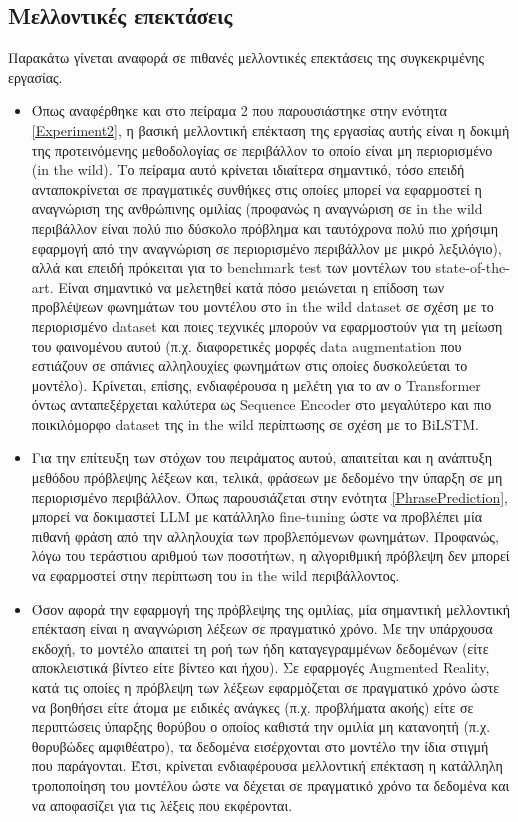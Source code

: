 \subsection{Μελλοντικές επεκτάσεις}
\label{Future}

Παρακάτω γίνεται αναφορά σε πιθανές μελλοντικές επεκτάσεις της συγκεκριμένης εργασίας.

\begin{itemize}

\item Όπως αναφέρθηκε και στο πείραμα 2 που παρουσιάστηκε στην ενότητα \ref{Experiment2}, η βασική μελλοντική επέκταση της εργασίας αυτής είναι η δοκιμή της προτεινόμενης μεθοδολογίας σε περιβάλλον το οποίο είναι μη περιορισμένο (in the wild). Το πείραμα αυτό κρίνεται ιδιαίτερα σημαντικό, τόσο επειδή ανταποκρίνεται σε πραγματικές συνθήκες στις οποίες μπορεί να εφαρμοστεί η αναγνώριση της ανθρώπινης ομιλίας (προφανώς η αναγνώριση σε in the wild περιβάλλον είναι πολύ πιο δύσκολο πρόβλημα και ταυτόχρονα πολύ πιο χρήσιμη εφαρμογή από την αναγνώριση σε περιορισμένο περιβάλλον με μικρό λεξιλόγιο), αλλά και επειδή πρόκειται για το benchmark test των μοντέλων του state-of-the-art. Είναι σημαντικό να μελετηθεί κατά πόσο μειώνεται η επίδοση των προβλέψεων φωνημάτων του μοντέλου στο in the wild dataset σε σχέση με το περιορισμένο dataset και ποιες τεχνικές μπορούν να εφαρμοστούν για τη μείωση του φαινομένου αυτού (π.χ. διαφορετικές μορφές data augmentation που εστιάζουν σε σπάνιες αλληλουχίες φωνημάτων στις οποίες δυσκολεύεται το μοντέλο). Κρίνεται, επίσης, ενδιαφέρουσα η μελέτη για το αν ο Transformer όντως ανταπεξέρχεται καλύτερα ως Sequence Encoder στο μεγαλύτερο και πιο ποικιλόμορφο dataset της in the wild περίπτωσης σε σχέση με το BiLSTM.

\item Για την επίτευξη των στόχων του πειράματος αυτού, απαιτείται και η ανάπτυξη μεθόδου πρόβλεψης λέξεων και, τελικά, φράσεων με δεδομένο την ύπαρξη σε μη περιορισμένο περιβάλλον. Όπως παρουσιάζεται στην ενότητα \ref{PhrasePrediction}, μπορεί να δοκιμαστεί LLM με κατάλληλο fine-tuning ώστε να προβλέπει μία πιθανή φράση από την αλληλουχία των προβλεπόμενων φωνημάτων. Προφανώς, λόγω του τεράστιου αριθμού των ποσοτήτων, η αλγοριθμική πρόβλεψη δεν μπορεί να εφαρμοστεί στην περίπτωση του in the wild περιβάλλοντος.

\item Όσον αφορά την εφαρμογή της πρόβλεψης της ομιλίας, μία σημαντική μελλοντική επέκταση είναι η αναγνώριση λέξεων σε πραγματικό χρόνο. Με την υπάρχουσα εκδοχή, το μοντέλο απαιτεί τη ροή των ήδη καταγεγραμμένων δεδομένων (είτε αποκλειστικά βίντεο είτε βίντεο και ήχου). Σε εφαρμογές Augmented Reality, κατά τις οποίες η πρόβλεψη των λέξεων εφαρμόζεται σε πραγματικό χρόνο ώστε να βοηθήσει είτε άτομα με ειδικές ανάγκες (π.χ. προβλήματα ακοής) είτε σε περιπτώσεις ύπαρξης θορύβου ο οποίος καθιστά την ομιλία μη κατανοητή (π.χ. θορυβώδες αμφιθέατρο), τα δεδομένα εισέρχονται στο μοντέλο την ίδια στιγμή που παράγονται. Έτσι, κρίνεται ενδιαφέρουσα μελλοντική επέκταση η κατάλληλη τροποποίηση του μοντέλου ώστε να δέχεται σε πραγματικό χρόνο τα δεδομένα και να αποφασίζει για τις λέξεις που εκφέρονται.


\end{itemize}
